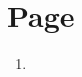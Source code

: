 \documentclass[12pt]{report}
\begin{document}
\section{Page }
\begin{enumerate}
\setlength\itemsep{1em}
    \item{}
\end{enumerate}
\end{document}
